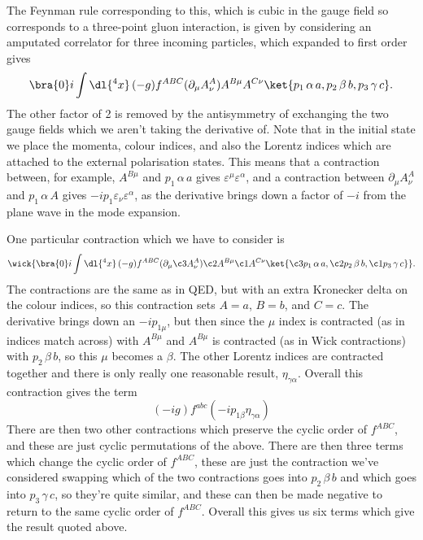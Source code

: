 \documentclass[fleqn]{NotesClass}
\newcommand{\minkowskiMetric}{\eta}
\begin{document}
    The Feynman rule corresponding to this, which is cubic in the gauge field so corresponds to a three-point gluon interaction, is given by considering an amputated correlator for three incoming particles, which expanded to first order gives
    \begin{equation}
        \bra{0} i \int \dl{^4x} \, (-g)f^{ABC}(\partial_\mu A^A_\nu)A^{B\mu}A^{C\nu}\ket{p_1 \, \alpha \, a, p_2 \, \beta \, b, p_3 \, \gamma \, c}.
    \end{equation}
    The other factor of 2 is removed by the antisymmetry of exchanging the two gauge fields which we aren't taking the derivative of.
    Note that in the initial state we place the momenta, colour indices, and also the Lorentz indices which are attached to the external polarisation states.
    This means that a contraction between, for example, \(A^{B\mu}\) and \(p_1 \, \alpha \, a\) gives \(\varepsilon^\mu \varepsilon^\alpha\), and a contraction between \(\partial_\mu A^A_\nu\) and \(p_1 \, \alpha \, A\) gives \(-ip_1 \varepsilon_\nu \varepsilon^\alpha\), as the derivative brings down a factor of \(-i\) from the plane wave in the mode expansion.
    
    One particular contraction which we have to consider is
    \begin{equation}
        \wick{\bra{0} i \int \dl{^4x} \, (-g)f^{ABC}(\partial_\mu \c3{A}^A_\nu)\c2{A}^{B\mu}\c1{A}^{C\nu}\ket{\c3{p}_1 \, \alpha \, a, \c2{p}_2 \, \beta \, b, \c1{p}_3 \, \gamma \, c}}.
    \end{equation}
    The contractions are the same as in QED, but with an extra Kronecker delta on the colour indices, so this contraction sets \(A = a\), \(B = b\), and \(C = c\).
    The derivative brings down an \(-ip_{1\mu}\), but then since the \(\mu\) index is contracted (as in indices match across) with \(A^{B\mu}\) and \(A^{B\mu}\) is contracted (as in Wick contractions) with \(p_2 \, \beta \, b\), so this \(\mu\) becomes a \(\beta\).
    The other Lorentz indices are contracted together and there is only really one reasonable result, \(\minkowskiMetric_{\gamma\alpha}\).
    Overall this contraction gives the term
    \begin{equation}
        (-ig) f^{abc}(-ip_{1\beta}\minkowskiMetric_{\gamma\alpha})
    \end{equation}
    There are then two other contractions which preserve the cyclic order of \(f^{ABC}\), and these are just cyclic permutations of the above.
    There are then three terms which change the cyclic order of \(f^{ABC}\), these are just the contraction we've considered swapping which of the two contractions goes into \(p_2 \, \beta \, b\) and which goes into \(p_3 \, \gamma \, c\), so they're quite similar, and these can then be made negative to return to the same cyclic order of \(f^{ABC}\).
    Overall this gives us six terms which give the result quoted above.
    
\end{document}
